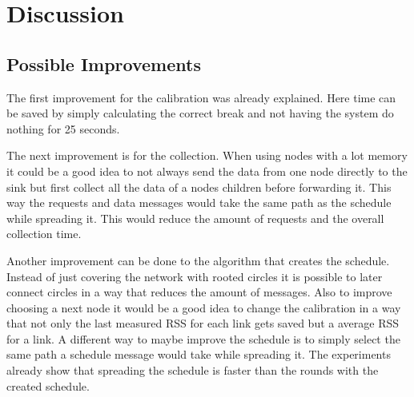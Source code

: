 \chapter{Discussion}



\section{Possible Improvements}
The first improvement for the calibration was already explained. Here time can be saved by simply calculating the correct break and not having the system do nothing for 25 seconds.

The next improvement is for the collection. When using nodes with a lot memory it could be a good idea to not always send the data from one node directly to the sink but first collect all the data of a nodes children before forwarding it. This way the requests and data messages would take the same path as the schedule while spreading it. This would reduce the amount of requests and the overall collection time.
 
Another improvement can be done to the algorithm that creates the schedule. Instead of just covering the network with rooted circles it is possible to later connect circles in a way that reduces the amount of messages. Also to improve choosing a next node it would be a good idea to change the calibration in a way that not only the last measured RSS for each link gets saved but a average RSS for a link.
A different way to maybe improve the schedule is to simply select the same path a schedule message would take while spreading it. The experiments already show that spreading the schedule is faster than the rounds with the created schedule. 

